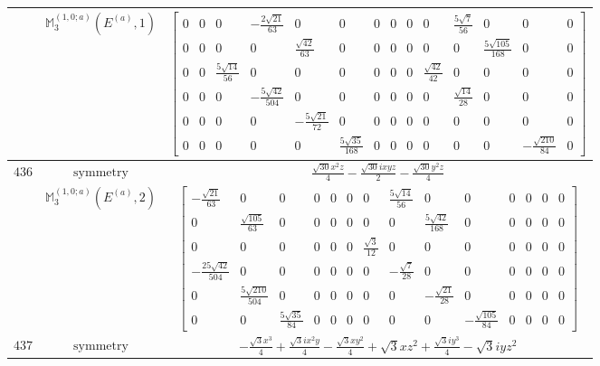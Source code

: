\documentclass[fleqn,8pt,landscape]{jsarticle}
\begin{document}
\begin{longtable}{ccc}
$  $ & $ \mathbb{M}_{3}^{(1,0;a)}(E^{(a)},1) $ & $ \begin{bmatrix} 0 & 0 & 0 & - \frac{2 \sqrt{21}}{63} & 0 & 0 & 0 & 0 & 0 & 0 & \frac{5 \sqrt{7}}{56} & 0 & 0 & 0 \\ 0 & 0 & 0 & 0 & \frac{\sqrt{42}}{63} & 0 & 0 & 0 & 0 & 0 & 0 & \frac{5 \sqrt{105}}{168} & 0 & 0 \\ 0 & 0 & \frac{5 \sqrt{14}}{56} & 0 & 0 & 0 & 0 & 0 & 0 & \frac{\sqrt{42}}{42} & 0 & 0 & 0 & 0 \\ 0 & 0 & 0 & - \frac{5 \sqrt{42}}{504} & 0 & 0 & 0 & 0 & 0 & 0 & \frac{\sqrt{14}}{28} & 0 & 0 & 0 \\ 0 & 0 & 0 & 0 & - \frac{5 \sqrt{21}}{72} & 0 & 0 & 0 & 0 & 0 & 0 & 0 & 0 & 0 \\ 0 & 0 & 0 & 0 & 0 & \frac{5 \sqrt{35}}{168} & 0 & 0 & 0 & 0 & 0 & 0 & - \frac{\sqrt{210}}{84} & 0 \end{bmatrix} $ \\ \hline
$ 436 $ & $ \text{symmetry} $ & $ \frac{\sqrt{30} x^{2} z}{4} - \frac{\sqrt{30} i x y z}{2} - \frac{\sqrt{30} y^{2} z}{4} $ \\
$  $ & $ \mathbb{M}_{3}^{(1,0;a)}(E^{(a)},2) $ & $ \begin{bmatrix} - \frac{\sqrt{21}}{63} & 0 & 0 & 0 & 0 & 0 & 0 & \frac{5 \sqrt{14}}{56} & 0 & 0 & 0 & 0 & 0 & 0 \\ 0 & \frac{\sqrt{105}}{63} & 0 & 0 & 0 & 0 & 0 & 0 & \frac{5 \sqrt{42}}{168} & 0 & 0 & 0 & 0 & 0 \\ 0 & 0 & 0 & 0 & 0 & 0 & \frac{\sqrt{3}}{12} & 0 & 0 & 0 & 0 & 0 & 0 & 0 \\ - \frac{25 \sqrt{42}}{504} & 0 & 0 & 0 & 0 & 0 & 0 & - \frac{\sqrt{7}}{28} & 0 & 0 & 0 & 0 & 0 & 0 \\ 0 & \frac{5 \sqrt{210}}{504} & 0 & 0 & 0 & 0 & 0 & 0 & - \frac{\sqrt{21}}{28} & 0 & 0 & 0 & 0 & 0 \\ 0 & 0 & \frac{5 \sqrt{35}}{84} & 0 & 0 & 0 & 0 & 0 & 0 & - \frac{\sqrt{105}}{84} & 0 & 0 & 0 & 0 \end{bmatrix} $ \\ \hline
$ 437 $ & $ \text{symmetry} $ & $ - \frac{\sqrt{3} x^{3}}{4} + \frac{\sqrt{3} i x^{2} y}{4} - \frac{\sqrt{3} x y^{2}}{4} + \sqrt{3} x z^{2} + \frac{\sqrt{3} i y^{3}}{4} - \sqrt{3} i y z^{2} $ \\

\end{longtable}
\end{document}
